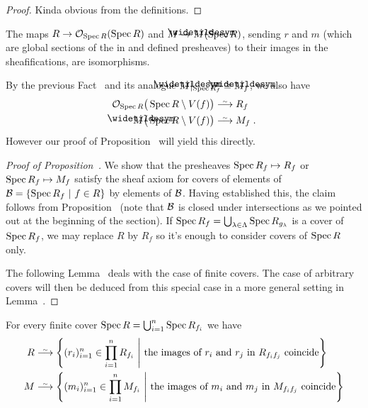 \documentclass[a4paper,parskip=half,numbers=enddot, DIV=12]{scrreprt}
\begin{document}
\begin{proof}
	Kinda obvious from the definitions.
\end{proof}
\begin{prop}
    The maps $R\morphism \Oo_{\Spec R}(\Spec R)$ and $M\morphism \snake M (\Spec R)$, sending $r$ and $m$ (which are global sections of the in  and  defined presheaves) to their images in the sheafifications, are isomorphisms.
\end{prop}
\begin{rem*}
    By the previous Fact~ and its analogue $\snake M|_{\Spec R_f} \cong \snake{M}_f$, we also have
    \begin{align*}
        \Oo_{\Spec R}\big(\Spec R\setminus V(f)\big) &\isomorphism R_f\\
        \snake M\big(\Spec R\setminus V(f)\big) &\isomorphism M_f\;.
    \end{align*}
    However our proof of Proposition~ will yield this directly.
\end{rem*}
\begin{proof}[Proof of Proposition~]
    We show that the presheaves $\operatorname{Spec} R_f\mapsto R_f$ or $\operatorname{Spec} R_f\mapsto M_f$ satisfy the sheaf axiom for covers of elements of $\mathcal{B}= \left\{\operatorname{Spec} R_f\ \middle|\  f\in R\right\}$ by elements of $\mathcal{B}$. Having established this, the claim follows from Proposition~ (note that $\mathcal{B}$ is closed under intersections as we pointed out at the beginning of the section).  If $\operatorname{Spec} R_f = \bigcup_{\lambda\in\Lambda} \operatorname{Spec} R_{g_\lambda}$ is a cover of $\operatorname{Spec} R_f$, we may replace $R$ by $R_f$ so it's enough to consider covers of $\operatorname{Spec} R$ only.
    
    The following Lemma~ deals with the case of finite covers. The case of arbitrary covers will then be deduced from this special case in a more general setting in Lemma~.
\end{proof}
\begin{lem}
    For every finite cover $\operatorname{Spec} R = \bigcup_{i=1}^n \operatorname{Spec} R_{f_i}$ we have
    \begin{align*}
        R &\isomorphism\left\{(r_i)_{i=1}^n \in \prod_{i=1}^n R_{f_i}\st \text{the images of } r_i \text{ and } r_j \text{ in } R_{f_if_j} \text{ coincide}\right\}\\
        M &\isomorphism\left\{(m_i)_{i=1}^n \in \prod_{i=1}^n M_{f_i}\st \text{the images of } m_i \text{ and } m_j \text{ in } M_{f_if_j} \text{ coincide}\right\}
    \end{align*}
\end{lem}
\end{document}
